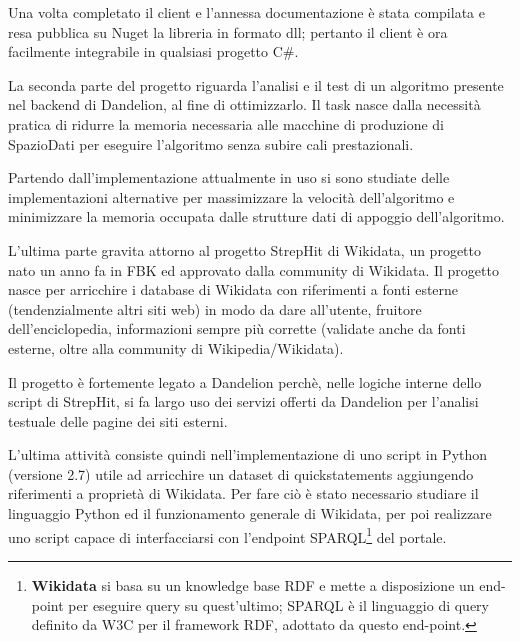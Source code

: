 Una volta completato il client e l'annessa documentazione è stata compilata e resa pubblica su Nuget\cite{nuget} la libreria in formato dll; 
pertanto il client è ora facilmente integrabile in qualsiasi progetto C$\#$.

La seconda parte del progetto riguarda l'analisi e il test di un algoritmo presente nel backend di Dandelion, al fine di ottimizzarlo. 
Il task nasce dalla necessità pratica di ridurre la memoria necessaria alle macchine di produzione di SpazioDati per eseguire l'algoritmo senza subire cali prestazionali.

Partendo dall'implementazione attualmente in uso si sono studiate delle implementazioni alternative per massimizzare la velocità dell'algoritmo e minimizzare 
la memoria occupata dalle strutture dati di appoggio dell'algoritmo. 

L'ultima parte gravita attorno al progetto StrepHit di Wikidata, un progetto nato un anno fa in FBK\cite{fbk} ed approvato dalla community di Wikidata. 
Il progetto nasce per arricchire i database di Wikidata con riferimenti a fonti esterne (tendenzialmente altri siti web) in modo da dare all'utente, fruitore dell'enciclopedia, 
informazioni sempre più corrette (validate anche da fonti esterne, oltre alla community di Wikipedia/Wikidata).

Il progetto è fortemente legato a Dandelion perchè, nelle logiche interne dello script di StrepHit, si fa largo uso dei servizi offerti da Dandelion per l'analisi testuale 
delle pagine dei siti esterni.

L'ultima attività consiste quindi nell'implementazione di uno script in Python (versione 2.7) utile ad arricchire un dataset di quickstatements\cite{quickstatements} aggiungendo riferimenti a proprietà di Wikidata.
Per fare ciò è stato necessario studiare il linguaggio Python ed il funzionamento generale di Wikidata, per poi realizzare uno script capace di interfacciarsi con l'endpoint SPARQL\footnote{
    \textbf{Wikidata}\cite{wikidata} si basa su un knowledge base RDF\cite{rdf} e mette a disposizione un end-point per eseguire query su quest'ultimo; 
    SPARQL\cite{sparql-query} è il linguaggio di query definito da W3C\cite{w3c} per il framework RDF, adottato da questo end-point.
} del portale.
